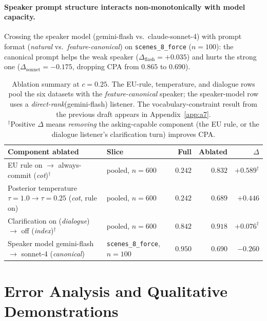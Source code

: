 \documentclass[11pt]{article}
\begin{document}
\paragraph{Speaker prompt structure interacts non-monotonically with model capacity.}
Crossing the speaker model (gemini-flash vs.\ claude-sonnet-4) with
prompt format (\textit{natural} vs.\ \textit{feature-canonical}) on
\texttt{scenes\_8\_force} ($n{=}100$): the canonical prompt helps the
weak speaker ($\Delta_{\text{flash}}{=}{+}0.035$) and hurts the strong
one ($\Delta_{\text{sonnet}}{=}{-}0.175$, dropping CPA from $0.865$ to
$0.690$). 

\begin{table}[ht]
\centering
\small
\setlength{\tabcolsep}{4pt}
\begin{tabular}{p{5.7cm}p{2.7cm}rrr}
\toprule
Component ablated & Slice & Full & Ablated & $\Delta$ \\
\midrule
EU rule on $\to$ always-commit (\textit{cot})$^{\dagger}$
  & pooled, $n{=}600$ & $0.242$ & $0.832$ & $+0.589^{\dagger}$ \\
Posterior temperature $\tau{=}1.0 \to \tau{=}0.25$ \newline (\textit{cot}, rule on)
  & pooled, $n{=}600$ & $0.242$ & $0.689$ & $+0.446$ \\
Clarification on (\textit{dialogue}) $\to$ off (\textit{index})$^{\dagger}$
  & pooled, $n{=}600$ & $0.842$ & $0.918$ & $+0.076^{\dagger}$ \\
Speaker model gemini-flash $\to$ sonnet-4 (\textit{canonical})
  & \texttt{scenes\_8\_force}, $n{=}100$ & $0.950$ & $0.690$ & $-0.260$ \\
\bottomrule
\end{tabular}
\caption{Ablation summary at $c{=}0.25$. The EU-rule, temperature, and
dialogue rows pool the six datasets with the \textit{feature-canonical}
speaker; the speaker-model row uses a \textit{direct-rank}(gemini-flash)
listener. The vocabulary-constraint result from the previous draft
appears in Appendix~\ref{app:a7}. \\ $^{\dagger}$Positive $\Delta$ means
\emph{removing} the asking-capable component (the EU rule, or the
dialogue listener's clarification turn) improves CPA.}
\label{tab:analysis}
\end{table}

\section{Error Analysis and Qualitative Demonstrations}
\label{sec:error-qualitative}
\end{document}
